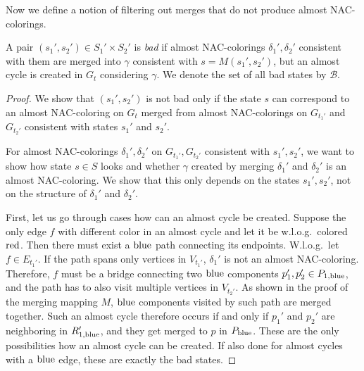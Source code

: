 Now we define a notion of filtering out
merges that do not produce almost NAC-colorings.
%
\begin{definition}
	A pair \( (s_1', s_2') \in S_1' \times S_2'\) is \emph{bad}
	if almost NAC-colorings \( \delta_1', \delta_2' \) consistent with them are merged
	into \rbcol{} \( \gamma \) consistent with \( s = M(s_1', s_2') \),
	but an almost cycle is created in \( G_t \) considering \( \gamma \).
	We denote the set of all bad states by \( \mathcal{B} \).
\end{definition}
%
%
\begin{proof}
	We show that \( (s_1', s_2') \) is not bad only if the state \( s \)
	can correspond to an almost NAC-coloring on \( G_t \)
	merged from almost NAC-colorings on \( G_{t_1'} \) and \( G_{t_2'} \)
	consistent with states \( s_1' \) and \( s_2' \).

	For almost NAC-colorings \( \delta_1', \delta_2' \) on \( G_{t_1'}, G_{t_2'} \)
	consistent with \( s_1', s_2' \),
	we want to show how state \( s \in S \) looks and
	whether \rbcol{} \( \gamma \) created by merging \( \delta_1' \) and \( \delta_2' \)
	is an almost NAC-coloring.
	We show that this only depends on the states \( s_1', s_2' \),
	not on the structure of \( \delta_1' \) and \( \delta_2' \).

	First, let us go through cases how can an almost cycle be created.
	Suppose the only edge \( f \) with different color
	in an almost cycle and let it be w.l.o.g.\ colored \( \text{red} \).
	Then there must exist a \( \text{blue} \) path connecting its endpoints.
	W.l.o.g.\ let \( f \in E_{t_1'} \).
	If the path spans only vertices
	in \( V_{t_1'} \), \( \delta_1' \) is not an almost NAC-coloring.
	Therefore, \( f \) must be
	a bridge connecting two \( \text{blue} \) components \( p_1', p_2' \in P_{1,\text{blue}} \),
	and the path has to also visit multiple vertices in \( V_{t_2'} \).
	As shown in the proof of the merging mapping \( M \), \( \text{blue} \) components
	visited by such path are merged together.
	Such an almost cycle therefore occurs
	if and only if \( p_1' \) and \( p_2' \) are neighboring in \( R_{1,\text{blue}}' \),
	and they get merged to \( p \) in \( P_{\text{blue}} \).
	These are the only possibilities how an almost cycle can be created.
	If also done for almost cycles with a \( \text{blue} \) edge,
	these are exactly the bad states.
\end{proof}
%

